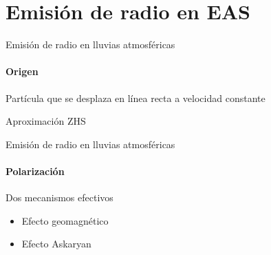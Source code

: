 \section[Emisi\'on]{Emisi\'on de radio en EAS}

\begin{frame}{Emisi\'on de radio en lluvias atmosf\'ericas}
\framesubtitle{Origen}
\footnotesize
	
	\begin{block}{Part\'icula que se desplaza en l\'inea recta a velocidad constante}
		\begin{center}
		\end{center}
	\end{block}
	
	\begin{block}{Aproximaci\'on ZHS}
		\begin{center}
		\end{center}
	\end{block}
\end{frame}

\begin{frame}{Emisi\'on de radio en lluvias atmosf\'ericas}
\framesubtitle{Polarizaci\'on}
\footnotesize
	
	\begin{exampleblock}{Dos mecanismos efectivos}
		\begin{itemize}[<alert@+|+->]
		 \item Efecto geomagn\'etico
		 \item Efecto Askaryan
		\end{itemize}
	\end{exampleblock}
	\vfill
	\begin{overprint}
		\centerline{}
		\centerline{}
	\end{overprint}
\end{frame}

% 		

